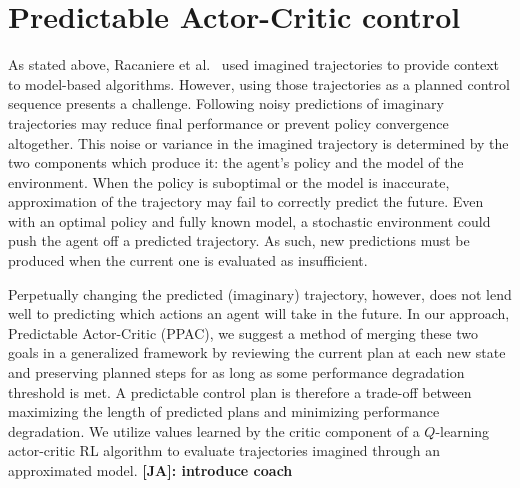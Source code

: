 \documentclass{article}
\newcommand{\JA}[1] {{\color{red} \textbf{[JA]: #1}}}
\begin{document}

    \section{Predictable Actor-Critic control} \label{section:PAC}


        As stated above, Racaniere et al.~\citeyear{racaniere2017imagination} used imagined trajectories to provide context to model-based algorithms. However, using those trajectories as a planned control sequence presents a challenge. Following noisy predictions of imaginary trajectories may reduce final performance or prevent policy convergence altogether. This noise or variance in the imagined trajectory is determined by the two components which produce it: the agent's policy and the model of the environment. When the policy is suboptimal or the model is inaccurate, approximation of the trajectory may fail to correctly predict the future. Even with an optimal policy and fully known model, a stochastic environment could push the agent off a predicted trajectory. As such, new predictions must be produced when the current one is evaluated as insufficient.

        Perpetually changing the predicted (imaginary) trajectory, however, does not lend well to predicting which actions an agent will take in the future.
        In our approach, Predictable Actor-Critic (PPAC), we suggest a method of merging these two goals in a generalized framework by reviewing the current plan at each new state and preserving planned steps for as long as some performance degradation threshold is met.
        A predictable control plan is therefore a trade-off between maximizing the length of predicted plans and minimizing performance degradation. We utilize values learned by the critic component of a $Q$-learning actor-critic RL algorithm to evaluate trajectories imagined through an approximated model. \JA{introduce coach} 
\end{document}
